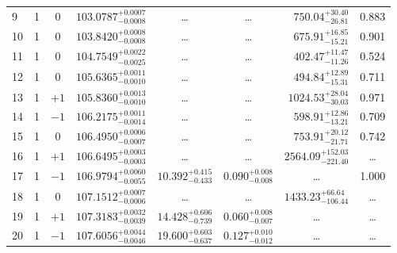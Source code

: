 \begin{table*}[!]
\begin{tabular}{llcrrlrc}
9 & 1 & 0 & $    103.0787_{-      0.0008}^{+      0.0007}$ & \multicolumn{1}{c}{\dots} & \multicolumn{1}{c}{\dots} & $      750.04_{-       26.81}^{+       30.40}$ & 0.883\\[1pt]
10 & 1 & 0 & $    103.8420_{-      0.0008}^{+      0.0008}$ & \multicolumn{1}{c}{\dots} & \multicolumn{1}{c}{\dots} & $      675.91_{-       15.21}^{+       16.85}$ & 0.901\\[1pt]
11 & 1 & 0 & $    104.7549_{-      0.0025}^{+      0.0022}$ & \multicolumn{1}{c}{\dots} & \multicolumn{1}{c}{\dots} & $      402.47_{-       11.26}^{+       11.47}$ & 0.524\\[1pt]
12 & 1 & 0 & $    105.6365_{-      0.0010}^{+      0.0011}$ & \multicolumn{1}{c}{\dots} & \multicolumn{1}{c}{\dots} & $      494.84_{-       15.31}^{+       12.89}$ & 0.711\\[1pt]
13 & 1 & $+1$ & $    105.8360_{-      0.0010}^{+      0.0013}$ & \multicolumn{1}{c}{\dots} & \multicolumn{1}{c}{\dots} & $     1024.53_{-       30.03}^{+       28.04}$ & 0.971\\[1pt]
14 & 1 & $-1$ & $    106.2175_{-      0.0014}^{+      0.0011}$ & \multicolumn{1}{c}{\dots} & \multicolumn{1}{c}{\dots} & $      598.91_{-       13.21}^{+       12.86}$ & 0.709\\[1pt]
15 & 1 & 0 & $    106.4950_{-      0.0007}^{+      0.0006}$ & \multicolumn{1}{c}{\dots} & \multicolumn{1}{c}{\dots} & $      753.91_{-       21.71}^{+       20.12}$ & 0.742\\[1pt]
16 & 1 & $+1$ & $    106.6495_{-      0.0003}^{+      0.0003}$ & \multicolumn{1}{c}{\dots} & \multicolumn{1}{c}{\dots} & $     2564.09_{-      221.40}^{+      152.03}$ & \dots\\[1pt]
17 & 1 & $-1$ & $    106.9794_{-      0.0055}^{+      0.0060}$ & $      10.392_{-       0.433}^{+       0.415}$ & $       0.090_{-       0.008}^{+       0.008}$ & \multicolumn{1}{c}{\dots} & 1.000\\[1pt]
18 & 1 & 0 & $    107.1512_{-      0.0006}^{+      0.0007}$ & \multicolumn{1}{c}{\dots} & \multicolumn{1}{c}{\dots} & $     1433.23_{-      106.44}^{+       66.64}$ & \dots \\[1pt]
19 & 1 & $+1$ & $    107.3183_{-      0.0039}^{+      0.0032}$ & $      14.428_{-       0.739}^{+       0.606}$ & $       0.060_{-       0.007}^{+       0.008}$ & \multicolumn{1}{c}{\dots} & \dots \\[1pt]
20 & 1 & $-1$ & $    107.6056_{-      0.0046}^{+      0.0044}$ & $      19.600_{-       0.637}^{+       0.603}$ & $       0.127_{-       0.012}^{+       0.010}$ & \multicolumn{1}{c}{\dots} & \dots \\[1pt]

\end{tabular}
\end{table*}
